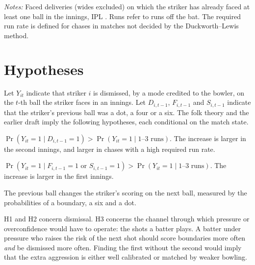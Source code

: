 \documentclass[11pt]{article}
\begin{document}
\begin{table}[tbp]
\centering
\begin{threeparttable}
\caption{Descriptive statistics}\label{tab:desc}
\small

\begin{tablenotes}[flushleft]\footnotesize
\item \emph{Notes:} Faced deliveries (wides excluded) on which the striker has already faced at least one ball in the innings, IPL \Seasons. Runs refer to runs off the bat. The required run rate is defined for chases in matches not decided by the Duckworth--Lewis method.
\end{tablenotes}
\end{threeparttable}
\end{table}

\section{Hypotheses}\label{sec:hyp}

Let $Y_{it}$ indicate that striker $i$ is dismissed, by a mode credited to the bowler, on the $t$-th ball the striker faces in an innings. Let $D_{i,t-1}$, $F_{i,t-1}$ and $S_{i,t-1}$ indicate that the striker's previous ball was a dot, a four or a six. The folk theory and the earlier draft imply the following hypotheses, each conditional on the match state.

\begin{description}[leftmargin=1.5em,style=nextline]
\item[H1 (pressure).] $\Pr(Y_{it}=1 \mid D_{i,t-1}=1) > \Pr(Y_{it}=1 \mid \text{1--3 runs})$. The increase is larger in the second innings, and larger in chases with a high required run rate.
\item[H2 (overconfidence).] $\Pr(Y_{it}=1 \mid F_{i,t-1}=1 \text{ or } S_{i,t-1}=1) > \Pr(Y_{it}=1 \mid \text{1--3 runs})$. The increase is larger in the first innings.
\item[H3 (behavioural response).] The previous ball changes the striker's scoring on the next ball, measured by the probabilities of a boundary, a six and a dot.
\end{description}

H1 and H2 concern dismissal. H3 concerns the channel through which pressure or overconfidence would have to operate: the shots a batter plays. A batter under pressure who raises the risk of the next shot should score boundaries more often \emph{and} be dismissed more often. Finding the first without the second would imply that the extra aggression is either well calibrated or matched by weaker bowling.
\end{document}
